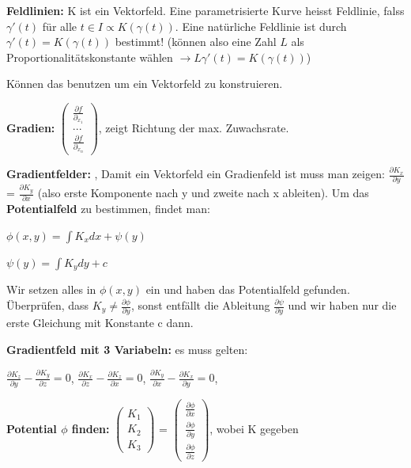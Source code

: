 \documentclass[a3paper, ngerman, 8pt]{article}
\begin{document}
\begin{multicols*}{3}
\textbf{Feldlinien: } K ist ein Vektorfeld. Eine parametrisierte Kurve heisst Feldlinie, falss $\gamma ' (t)$ für alle $t\in I \propto K(\gamma (t))$. Eine natürliche Feldlinie ist durch $\gamma ' (t) = K(\gamma (t))$ bestimmt! (können also eine Zahl $L$ als Proportionalitätskonstante wählen $\to L\gamma ' (t) = K(\gamma (t))$) 

Können das benutzen um ein Vektorfeld zu konstruieren.

\textbf{Gradien:} $\begin{pmatrix}
\frac{\partial f}{\partial_{x_1}} \\
... \\
\frac{\partial f}{\partial_{x_n}}
\end{pmatrix}$, zeigt Richtung der max. Zuwachsrate.

\textbf{Gradientfelder:} , 
 Damit ein Vektorfeld ein Gradienfeld ist muss man zeigen: $\frac{\partial K_x}{\partial y}$ = $\frac{\partial K_y}{\partial x}$ (also erste Komponente nach y und zweite nach x ableiten). Um das \textbf{Potentialfeld} zu bestimmen, findet man: 

$\phi(x,y) = \int K_x dx + \psi(y)$ 

$\psi(y)=\int K_y dy + c$

Wir setzen alles in $\phi(x,y)$ ein und haben das Potentialfeld gefunden. Überprüfen, dass $K_y\neq\frac{\partial \phi}{\partial y}$, sonst entfällt die Ableitung $\frac{\partial \psi}{\partial y}$ und wir haben nur die erste Gleichung mit Konstante c dann. 

\textbf{Gradientfeld mit 3 Variabeln:} es muss gelten:

$\frac{\partial K_z}{\partial y}-\frac{\partial K_y}{\partial z} = 0$, $\frac{\partial K_x}{\partial z}-\frac{\partial K_z}{\partial x} = 0$, $\frac{\partial K_y}{\partial x}-\frac{\partial K_x}{\partial y} = 0$,

\textbf{Potential $\phi$ finden:} $\begin{pmatrix}
K_1 \\ K_2 \\ K_3 
\end{pmatrix}$ = 
$\begin{pmatrix}
\frac{\partial \phi}{\partial x} \\ \frac{\partial \phi}{\partial y} \\ \frac{\partial \phi}{\partial z} 
\end{pmatrix}$, wobei K gegeben


\end{multicols*}
\end{document}
